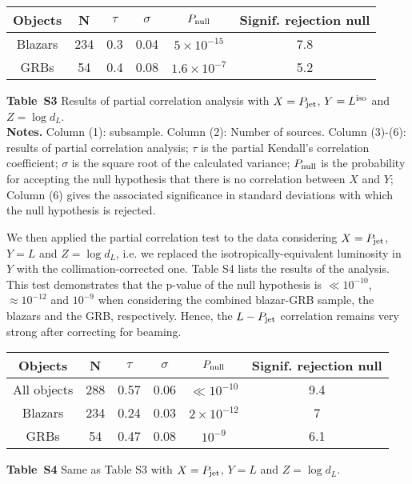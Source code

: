 \documentclass[12pt]{article}
\begin{document}
\begin{table}
\begin{center}
\begin{tabular}{cccccc}
\hline\hline
Objects & N & $\tau$ & $\sigma$ & $P_{\rm null}$ & Signif. rejection null \\
\hline
Blazars & 234 & 0.3 & 0.04 & $5 \times 10^{-15}$ & 7.8 \\
GRBs & 54 & 0.4 & 0.08 & $1.6 \times 10^{-7}$ & 5.2 \\
\hline
\end{tabular}
\label{tab:pca1}
\end{center}
{\bf Table~S3} Results of partial correlation analysis with $X=P_{\rm jet}$, $Y=L^{\rm iso}$ and $Z=\log d_L$. \\
{\bf Notes.} Column (1): subsample. Column (2): Number of sources. Column (3)-(6): results of partial correlation analysis; $\tau$ is the partial Kendall's correlation coefficient; $\sigma$ is the square root of the calculated variance; $P_{\rm null}$ is the probability for accepting the null hypothesis that there is no correlation between $X$ and $Y$; Column (6) gives the associated significance in standard deviations with which the null hypothesis is rejected.
\end{table}

We then applied the partial correlation test to the data considering $X=P_{\rm jet}$, $Y=L$ and $Z=\log d_L$, i.e. we replaced the isotropically-equivalent luminosity in $Y$ with the collimation-corrected one. Table S4 lists the results of the analysis. 
This test demonstrates that the p-value of the null hypothesis is $\ll 10^{-10}$, $\approx 10^{-12}$ and $10^{-9}$ when considering the combined blazar-GRB sample, the blazars and the GRB, respectively. Hence, the $L - P_{\rm jet}$ correlation remains very strong after correcting for beaming. 

\begin{table}
\begin{center}
\begin{tabular}{cccccc}
\hline\hline
Objects & N & $\tau$ & $\sigma$ & $P_{\rm null}$ & Signif. rejection null \\
\hline
All objects	 & 288 & 0.57 & 0.06 & $\ll 10^{-10}$ & 9.4 \\
Blazars & 234 & 0.24 & 0.03 & $2 \times 10^{-12}$ & 7 \\
GRBs & 54 & 0.47 & 0.08 & $10^{-9}$ & 6.1 \\
\hline
\end{tabular}
\label{tab:pca2}
\end{center}
{\bf Table~S4} Same as Table S3 with $X=P_{\rm jet}$, $Y=L$ and $Z=\log d_L$.
\end{table}
\end{document}
